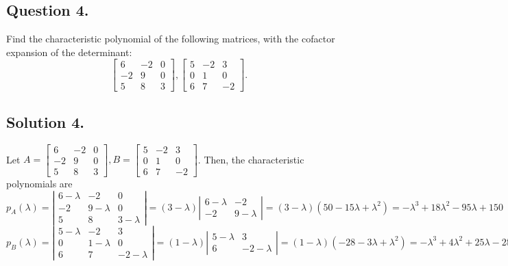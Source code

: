 \documentclass{article}
\begin{document}
\subsection*{Question 4.}
Find the characteristic polynomial of the following matrices, with the cofactor expansion of the determinant:
\[\left[\begin{array}{rrr}
6 & -2 & 0 \\
-2 & 9 & 0 \\
5 & 8 & 3
\end{array}\right],\left[\begin{array}{rrr}
5 & -2 & 3 \\
0 & 1 & 0 \\
6 & 7 & -2
\end{array}\right].\]
\subsection*{Solution 4.}
Let $A=\left[\begin{array}{rrr}
6 & -2 & 0 \\
-2 & 9 & 0 \\
5 & 8 & 3
\end{array}\right],B=\left[\begin{array}{rrr}
5 & -2 & 3 \\
0 & 1 & 0 \\
6 & 7 & -2
\end{array}\right]$. Then, the characteristic polynomials are
\[p_A(\lambda)=\left\vert\begin{array}{rrr}
6-\lambda & -2 & 0 \\
-2 & 9-\lambda & 0 \\
5 & 8 & 3-\lambda
\end{array}\right\vert=(3-\lambda)\left\vert\begin{array}{rr}
6-\lambda & -2 \\
-2 & 9-\lambda
\end{array}\right\vert=(3-\lambda)(50-15\lambda+\lambda^2)=-\lambda^3+18\lambda^2-95\lambda+150\]
\[p_B(\lambda)=\left\vert\begin{array}{rrr}
5-\lambda & -2 & 3 \\
0 & 1-\lambda & 0 \\
6 & 7 & -2-\lambda
\end{array}\right\vert=(1-\lambda)\left\vert\begin{array}{rr}
5-\lambda & 3 \\
6 & -2-\lambda
\end{array}\right\vert=(1-\lambda)(-28-3\lambda+\lambda^2)=-\lambda^3+4\lambda^2+25\lambda-28\]
\end{document}
